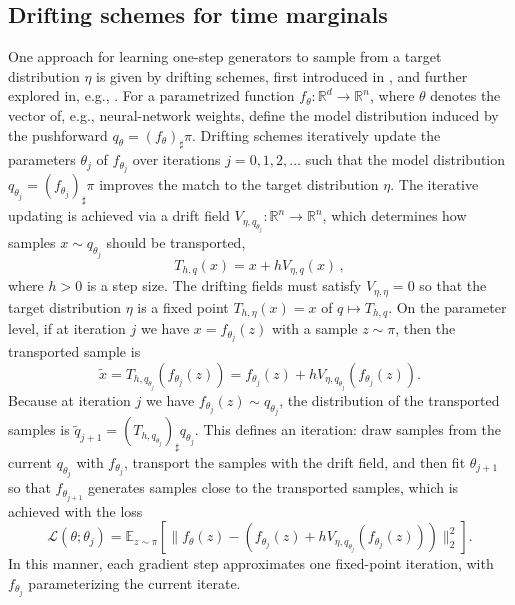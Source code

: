 \documentclass[10pt,a4paper]{amsart}
\newcommand{\R}{\mathbb{R}}
\begin{document}
\subsection{Drifting schemes for time marginals}
One approach 
    for learning one-step generators to sample from a target distribution $\eta$ is given by drifting schemes, first introduced in \cite{deng2026drifting}, and further explored in, e.g.,  \cite{han2026wflow,turan2026generativedriftingsecretlyscore,lai2026unifiedviewdriftingscorebased}.
For a parametrized function $f_{\theta}: \R^d  \to \R^n$, where $\theta$ denotes the vector of, e.g., neural-network weights, define the model distribution induced by the pushforward $q_{\theta}=(f_{\theta})_{\sharp}\pi$. 
Drifting schemes iteratively update the parameters $\theta_j$ of $f_{\theta_j}$ over iterations $j = 0, 1, 2, \dots$ such that the model distribution $q_{\theta_j} = (f_{\theta_j})_{\sharp}\pi$ improves the match to the target distribution $\eta$.
The iterative updating is achieved via a drift field $V_{\eta,q_{\theta_j}}: \mathbb{R}^n \to \mathbb{R}^n$, which determines how samples $x \sim q_{\theta_j}$ should be transported, 
    \[
    T_{h,q}(x) = 
    x + h V_{\eta, q}(x)\,,
    \]
    where $h > 0$ is a step size. 
The drifting fields must satisfy $V_{\eta, \eta} = 0$ so that the target distribution $\eta$ is a fixed  point $T_{h,\eta}(x) = x$ of $q \mapsto T_{h,q}$. 
On the parameter level, if at iteration $j$ we have $x = f_{\theta_j}(z)$ with a sample $z \sim \pi$, then the transported sample is 
    \[
    \tilde{x} = T_{h,q_{\theta_j}}(f_{\theta_j}(z)) = f_{\theta_j}(z)  + hV_{\eta, q_{\theta_j}}(f_{\theta_j}(z)).
    \]
Because at iteration $j$ we have $f_{\theta_j}(z) \sim q_{\theta_j}$, the distribution of the transported samples is $\tilde{q}_{j + 1} = (T_{h,q_{\theta_j}})_{\sharp}q_{\theta_j}$.
This defines an iteration: draw samples from the current $q_{\theta_j}$ with $f_{\theta_j}$, transport the samples with the drift field, and then fit $\theta_{j + 1}$ so that $f_{\theta_{j + 1}}$ generates samples close to the transported samples, which is achieved with the loss
    \begin{equation}\label{eq:vanilladriftloss}
        \mathcal{L}(\theta; \theta_j) = \mathbb{E}_{z \sim \pi} \left[\|f_{\theta}(z) - \left(f_{\theta_j}(z)+hV_{\eta,q_{\theta_j}}(f_{\theta_j}(z))\right)\|_2^2 \right].
    \end{equation}
In this manner, each gradient step approximates one fixed-point iteration, with $f_{\theta_j}$ parameterizing the current iterate.
\end{document}
